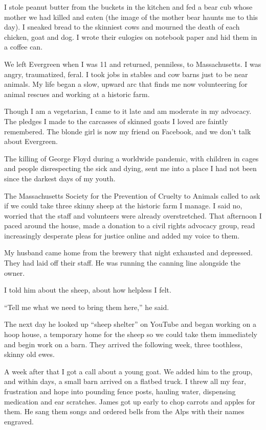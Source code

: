 I stole peanut butter from the buckets in the kitchen and fed a bear cub
whose mother we had killed and eaten (the image of the mother bear
haunts me to this day). I sneaked bread to the skinniest cows and
mourned the death of each chicken, goat and dog. I wrote their eulogies
on notebook paper and hid them in a coffee can.

We left Evergreen when I was 11 and returned, penniless, to
Massachusetts. I was angry, traumatized, feral. I took jobs in stables
and cow barns just to be near animals. My life began a slow, upward arc
that finds me now volunteering for animal rescues and working at a
historic farm.

Though I am a vegetarian, I came to it late and am moderate in my
advocacy. The pledges I made to the carcasses of skinned goats I loved
are faintly remembered. The blonde girl is now my friend on Facebook,
and we don't talk about Evergreen.

The killing of George Floyd during a worldwide pandemic, with children
in cages and people disrespecting the sick and dying, sent me into a
place I had not been since the darkest days of my youth.

The Massachusetts Society for the Prevention of Cruelty to Animals
called to ask if we could take three skinny sheep at the historic farm I
manage. I said no, worried that the staff and volunteers were already
overstretched. That afternoon I paced around the house, made a donation
to a civil rights advocacy group, read increasingly desperate pleas for
justice online and added my voice to them.

My husband came home from the brewery that night exhausted and
depressed. They had laid off their staff. He was running the canning
line alongside the owner.

I told him about the sheep, about how helpless I felt.

``Tell me what we need to bring them here,'' he said.

The next day he looked up ``sheep shelter'' on YouTube and began working
on a hoop house, a temporary home for the sheep so we could take them
immediately and begin work on a barn. They arrived the following week,
three toothless, skinny old ewes.

A week after that I got a call about a young goat. We added him to the
group, and within days, a small barn arrived on a flatbed truck. I threw
all my fear, frustration and hope into pounding fence posts, hauling
water, dispensing medication and ear scratches. James got up early to
chop carrots and apples for them. He sang them songs and ordered bells
from the Alps with their names engraved.

